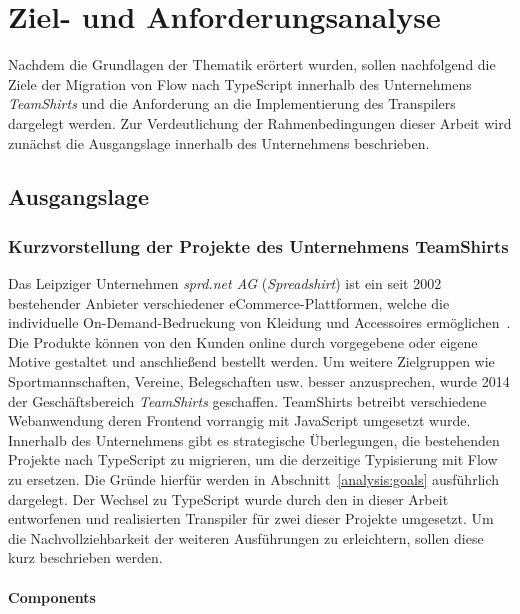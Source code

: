 \chapter{Ziel- und Anforderungsanalyse}
\label{chap:analysis}

Nachdem die Grundlagen der Thematik erörtert wurden, sollen nachfolgend die Ziele der Migration von Flow nach TypeScript innerhalb des Unternehmens \textit{TeamShirts} und die Anforderung an die Implementierung des Transpilers dargelegt werden. Zur Verdeutlichung der Rahmenbedingungen dieser Arbeit wird zunächst die Ausgangslage innerhalb des Unternehmens beschrieben.

\section{Ausgangslage}
\label{sec:status-quo}


\subsection{Kurzvorstellung der Projekte des Unternehmens TeamShirts}
\label{subsec:ts-projects}

Das Leipziger Unternehmen \textit{sprd.net AG} (\textit{Spreadshirt}) ist ein seit 2002 bestehender Anbieter verschiedener eCommerce-Plattformen, welche die individuelle On-Demand-Bedruckung von Kleidung und Accessoires ermöglichen~\autocite{SPREADSHIRT:ABOUT}. Die Produkte können von den Kunden online durch vorgegebene oder eigene Motive gestaltet und anschließend bestellt werden. Um weitere Zielgruppen wie Sportmannschaften, Vereine, Belegschaften usw. besser anzusprechen, wurde 2014 der Geschäftsbereich \textit{TeamShirts} geschaffen.
TeamShirts betreibt verschiedene Webanwendung deren Frontend vorrangig mit JavaScript umgesetzt wurde. Innerhalb des Unternehmens gibt es strategische Überlegungen, die bestehenden Projekte nach TypeScript zu migrieren, um die derzeitige Typisierung mit Flow zu ersetzen. Die Gründe hierfür werden in Abschnitt~\ref{analysis:goals} ausführlich dargelegt. Der Wechsel zu TypeScript wurde durch den in dieser Arbeit entworfenen und realisierten Transpiler für zwei dieser Projekte umgesetzt. Um die Nachvollziehbarkeit der weiteren Ausführungen zu erleichtern, sollen diese kurz beschrieben werden.

\subsubsection{Components}


